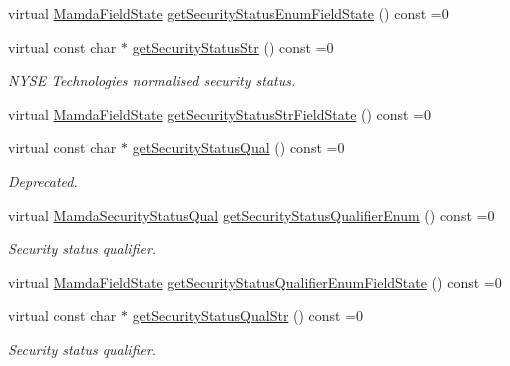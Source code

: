 \begin{CompactItemize}
virtual \hyperlink{namespaceWombat_93aac974f2ab713554fd12a1fa3b7d2a}{Mamda\-Field\-State} \hyperlink{classWombat_1_1MamdaSecStatusRecap_abd7b41fb4189d19dc1a064d78c58d3f}{get\-Security\-Status\-Enum\-Field\-State} () const =0
\item 
virtual const char $\ast$ \hyperlink{classWombat_1_1MamdaSecStatusRecap_4f195cb017b796ba8d82cd3c3b1c1504}{get\-Security\-Status\-Str} () const =0
\begin{CompactList}\small\item\em NYSE Technologies normalised security status. \item\end{CompactList}\item 
virtual \hyperlink{namespaceWombat_93aac974f2ab713554fd12a1fa3b7d2a}{Mamda\-Field\-State} \hyperlink{classWombat_1_1MamdaSecStatusRecap_f95c229e668def717ef05e1d8dc746ce}{get\-Security\-Status\-Str\-Field\-State} () const =0
\item 
virtual const char $\ast$ \hyperlink{classWombat_1_1MamdaSecStatusRecap_a33dfbf74883ec2304a39edc9e87b477}{get\-Security\-Status\-Qual} () const =0
\begin{CompactList}\small\item\em Deprecated. \item\end{CompactList}\item 
virtual \hyperlink{namespaceWombat_2de6f22c731ba94169dc24b8054862b8}{Mamda\-Security\-Status\-Qual} \hyperlink{classWombat_1_1MamdaSecStatusRecap_3e290ab8d414a7f40d224bdf4518da02}{get\-Security\-Status\-Qualifier\-Enum} () const =0
\begin{CompactList}\small\item\em Security status qualifier. \item\end{CompactList}\item 
virtual \hyperlink{namespaceWombat_93aac974f2ab713554fd12a1fa3b7d2a}{Mamda\-Field\-State} \hyperlink{classWombat_1_1MamdaSecStatusRecap_c5c0501e80486a14693e4acbb2b17b8e}{get\-Security\-Status\-Qualifier\-Enum\-Field\-State} () const =0
\item 
virtual const char $\ast$ \hyperlink{classWombat_1_1MamdaSecStatusRecap_770dd1fad1b1e74527b98062e0426759}{get\-Security\-Status\-Qual\-Str} () const =0
\begin{CompactList}\small\item\em Security status qualifier. \item\end{CompactList}\item 

\end{CompactItemize}
